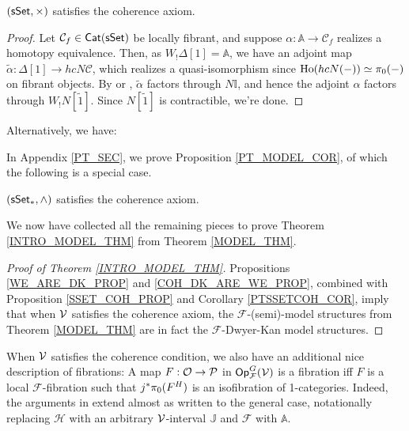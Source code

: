 \documentclass[a4paper,10pt
,draft
]{article}%
\renewcommand{\F}{\mathcal F}
\newcommand{\I}{\mathbb I}
\renewcommand{\1}{\eta}%
\begin{document}
\begin{proposition}
      \label{SSET_COH_PROP}
      $(\mathsf{sSet}, \times)$
      satisfies the coherence axiom.
\end{proposition}
\begin{proof}
      Let $\mathcal C_f \in \mathsf{Cat}(\mathsf{sSet})$ be locally fibrant, and
      suppose $\alpha: \mathbb A \to \mathcal C_f$ realizes a homotopy equivalence.
      Then, as $W_!\Delta[1] = \mathbb A$, we have an adjoint map $\tilde \alpha: \Delta[1] \to h c N \mathcal C$,
      which realizes a quasi-isomorphism since $\operatorname{Ho}(h c N (-)) \simeq \pi_0(-)$ on fibrant objects.
      By \cite[Corollary 1.6]{Joy02} or \cite[Lemma 0.15]{Rie}, $\tilde \alpha$ factors through $N \I$,
      and hence the adjoint $\alpha$ factors through $W_!N[\tilde 1]$.
      Since $N[\tilde 1]$ is contractible, we're done.
      
\end{proof}

Alternatively, we have:


In Appendix \ref{PT_SEC}, we prove Proposition \ref{PT_MODEL_COR}, of which the following is a special case.
\begin{corollary}
      \label{PTSSETCOH_COR}
      $(\sSet_{\**}, \wedge)$ satisfies the coherence axiom.
\end{corollary}

We now have collected all the remaining pieces to prove Theorem \ref{INTRO_MODEL_THM} from Theorem \ref{MODEL_THM}.

\begin{proof}
      [Proof of Theorem \ref{INTRO_MODEL_THM}]
      Propositions \ref{WE_ARE_DK_PROP} and \ref{COH_DK_ARE_WE_PROP},
      combined with Proposition \ref{SSET_COH_PROP} and Corollary \ref{PTSSETCOH_COR},
      imply that when $\mathcal V$ satisfies the coherence axiom, 
      the $\F$-(semi)-model structures from Theorem \ref{MODEL_THM} are in fact the $\F$-Dwyer-Kan model structures.
\end{proof}




\begin{remark}
      \label{FIB_ISOFIB_REM}
      When $\mathcal V$ satisfies the coherence condition, we also have an additional nice description of fibrations:
      A map $F: \mathcal{O} \to \mathcal{P}$ in $\Op^G_\F(\V)$ is a fibration iff
      $F$ is a local $\F$-fibration such that
      $j^{\**}\pi_0(F^H)$ is an isofibration of 1-categories.
      Indeed, the arguments in \cite[Propositions 2.3 and 2.5]{Ber07b} extend almost as written to the general case,
      notationally replacing $\mathcal H$ with an arbitrary $\mathcal V$-interval $\mathbb J$ and
      $\mathscr F$ with $\mathbb A$.
\end{remark}
\end{document}
